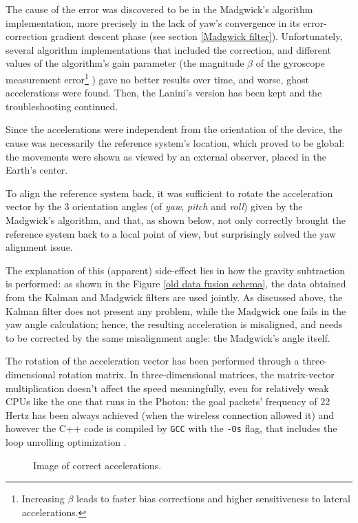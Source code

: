 The cause of the error was discovered to be in the Madgwick's algorithm implementation, more precisely in the lack of yaw's convergence in its error-correction gradient descent phase (see section \ref{Madgwick filter}). Unfortunately, several algorithm implementations that included the correction, and different values of the algorithm's gain parameter (the magnitude $\beta$ of the gyroscope measurement error\footnote{Increasing $\beta$ leads to faster bias corrections and higher sensitiveness to lateral accelerations.} \cite[13]{Mad10}) gave no better results over time, and worse, ghost accelerations were found. Then, the Lanini's version has been kept and the troubleshooting continued.
\bigbreak

Since the accelerations were independent from the orientation of the device, the cause was necessarily the reference system's location, which proved to be global: the movements were shown as viewed by an external observer, placed in the Earth's center.

To align the reference system back, it was sufficient to rotate the acceleration vector by the 3 orientation angles (of \textit{yaw}, \textit{pitch} and \textit{roll}) given by the Madgwick's algorithm, and that, as shown below, not only correctly brought the reference system back to a local point of view, but surprisingly solved the yaw alignment issue.

The explanation of this (apparent) side-effect lies in how the gravity subtraction is performed: as shown in the Figure \ref{old data fusion schema}, the data obtained from the Kalman and Madgwick filters are used jointly. As discussed above, the Kalman filter does not present any problem, while the Madgwick one fails in the yaw angle calculation; hence, the resulting acceleration is misaligned, and needs to be corrected by the same misalignment angle: the Madgwick's angle itself.
\bigbreak

The rotation of the acceleration vector has been performed through a three-dimensional rotation matrix. In three-dimensional matrices, the matrix-vector multiplication doesn't affect the speed meaningfully, even for relatively weak CPUs like the one that runs in the Photon: the goal packets' frequency of 22 Hertz \cite{Pio19} has been always achieved (when the wireless connection allowed it) and however the C++ code is compiled by \texttt{GCC} with the \texttt{-Os} flag, that includes the loop unrolling optimization \cite{UsingGCC}.

\begin{center}
	\begin{figure}[ht]
		\caption{Image of correct accelerations.}
	\end{figure}
\end{center}

